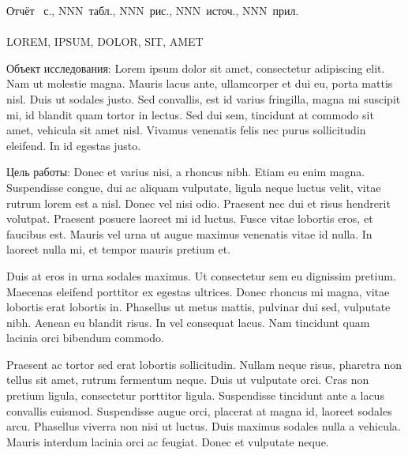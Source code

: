 \clearpage

Отчёт \pageref*{LastPage}~с., NNN~табл., NNN~рис.,  NNN~источ., NNN~прил.
~\\
~\\
LOREM, IPSUM, DOLOR, SIT, AMET

Объект исследования: Lorem ipsum dolor sit amet, consectetur adipiscing elit. Nam ut molestie magna. Mauris lacus ante, ullamcorper et dui eu, porta mattis nisl. Duis ut sodales justo. Sed convallis, est id varius fringilla, magna mi suscipit mi, id blandit quam tortor in lectus. Sed dui sem, tincidunt at commodo sit amet, vehicula sit amet nisl. Vivamus venenatis felis nec purus sollicitudin eleifend. In id egestas justo.

Цель работы: Donec et varius nisi, a rhoncus nibh. Etiam eu enim magna. Suspendisse congue, dui ac aliquam vulputate, ligula neque luctus velit, vitae rutrum lorem est a nisl. Donec vel nisi odio. Praesent nec dui et risus hendrerit volutpat. Praesent posuere laoreet mi id luctus. Fusce vitae lobortis eros, et faucibus est. Mauris vel urna ut augue maximus venenatis vitae id nulla. In laoreet nulla mi, et tempor mauris pretium et.

Duis at eros in urna sodales maximus. Ut consectetur sem eu dignissim pretium. Maecenas eleifend porttitor ex egestas ultrices. Donec rhoncus mi magna, vitae lobortis erat lobortis in. Phasellus ut metus mattis, pulvinar dui sed, vulputate nibh. Aenean eu blandit risus. In vel consequat lacus. Nam tincidunt quam lacinia orci bibendum commodo.

Praesent ac tortor sed erat lobortis sollicitudin. Nullam neque risus, pharetra non tellus sit amet, rutrum fermentum neque. Duis ut vulputate orci. Cras non pretium ligula, consectetur porttitor ligula. Suspendisse tincidunt ante a lacus convallis euismod. Suspendisse augue orci, placerat at magna id, laoreet sodales arcu. Phasellus viverra non nisi ut luctus. Duis maximus sodales nulla a vehicula. Mauris interdum lacinia orci ac feugiat. Donec et vulputate neque.